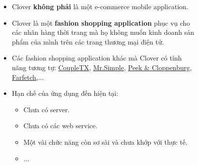 \documentclass{beamer}
\begin{document}
\begin{frame}
\begin{columns}
\begin{figure}
        \end{figure}
        \begin{itemize}
            \item Clover \textbf{không phải} là một e-commerce mobile application.
            \item Clover là một \textbf{fashion shopping application} phục vụ cho các nhãn hàng thời trang mà họ không muốn kinh doanh sản phẩm của mình trên các trang thương mại điện tử.
            \item Các fashion shopping application khác mà Clover có tính năng tương tự: \href{https://play.google.com/store/apps/details?id=com.coupletx&hl=vi&gl=US}{\color{blue} CoupleTX}, \href{https://play.google.com/store/apps/details?id=vn.mrsimple&hl=en&gl=US}{\color{blue} Mr.Simple}, \href{https://play.google.com/store/apps/details?id=com.peekcloppenburg.mobileshop&hl=en&gl=US}{\color{blue} Peek \& Cloppenburg}, \href{https://play.google.com/store/apps/details?id=com.farfetch.farfetchshop&hl=en&gl=US}{\color{blue} Farfetch},...

            \item Hạn chế của ứng dụng đến hiện tại:
                  \begin{itemize}
                      \item Chưa có server.
                      \item Chưa có các web service.
                      \item Một vài chức năng còn sơ sài và chưa khớp với thực tế.
                      \item ...
                  \end{itemize}
        \end{itemize}
    \end{columns}
\end{frame}
\end{document}
